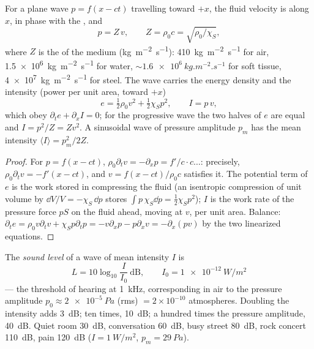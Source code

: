 \begin{proposition}\label{prop:b2:sound-waves:plane}
For a plane wave $p = f(x - ct)$ travelling toward $+x$, the fluid
velocity is along $x$, in phase with the , and
\[
p = Z\,v , \qquad Z = \rho_0c = \sqrt{\rho_0/\chi_S} ,
\]
where $Z$ is the \emph{} of the medium
(\unit{kg.m^{-2}.s^{-1}}): \qty{410}{kg.m^{-2}.s^{-1}} for air, \qty{1.5e6}{kg.m^{-2}.s^{-1}}
for water, $\sim\qty{1.6e6}{kg.m^{-2}.s^{-1}}$ for soft tissue,
\qty{4e7}{kg.m^{-2}.s^{-1}} for steel. The wave carries the energy density and
the intensity (power per unit area, toward $+x$)
\[
e = \tfrac12\rho_0v^2 + \tfrac12\chi_Sp^2 , \qquad I = p\,v ,
\]
which obey $\partial_te + \partial_xI = 0$; for the progressive wave the two
halves of $e$ are equal and $I = p^2/Z = Zv^2$. A sinusoidal wave of
pressure amplitude $p_m$ has the mean intensity $\langle I\rangle = p_m^2/2Z$.
\end{proposition}

\begin{proof}
For $p = f(x - ct)$, $\rho_0\partial_tv = -\partial_xp = f'/c\cdot c\dots$: precisely,
$\rho_0\partial_tv = -f'(x - ct)$, and $v = f(x - ct)/\rho_0c$ satisfies it. The
potential term of $e$ is the work stored in compressing the fluid
(an isentropic compression of unit volume by $\dd V/V = -\chi_S\,\dd p$
stores $\int p\,\chi_S\dd p = \tfrac12\chi_Sp^2$); $I$ is the work rate of the
pressure force $pS$ on the fluid ahead, moving at $v$, per unit area.
Balance: $\partial_te = \rho_0v\partial_tv + \chi_Sp\partial_tp = -v\partial_xp - p\partial_xv =
-\partial_x(pv)$ by the two linearized equations.
\end{proof}

\begin{definition}\label{def:b2:sound-waves:decibel}
The \emph{sound level} of a wave of mean intensity $I$ is
\[
L = 10\log_{10}\frac I{I_0} \ \text{dB} , \qquad I_0 = \qty{1e-12}{W/m^2}
\]
--- the threshold of hearing at \qty{1}{kHz}, corresponding in air to the
pressure amplitude $p_0 \approx \qty{2e-5}{Pa}$ (rms) $= 2 \times 10^{-10}$
atmospheres. Doubling the intensity adds \qty{3}{dB}; ten times, \qty{10}{dB};
a hundred times the pressure amplitude, \qty{40}{dB}. Quiet room
\qty{30}{dB}, conversation \qty{60}{dB}, busy street \qty{80}{dB}, rock concert
\qty{110}{dB}, pain \qty{120}{dB} ($I = \qty{1}{W/m^2}$, $p_m = \qty{29}{Pa}$).
\end{definition}

